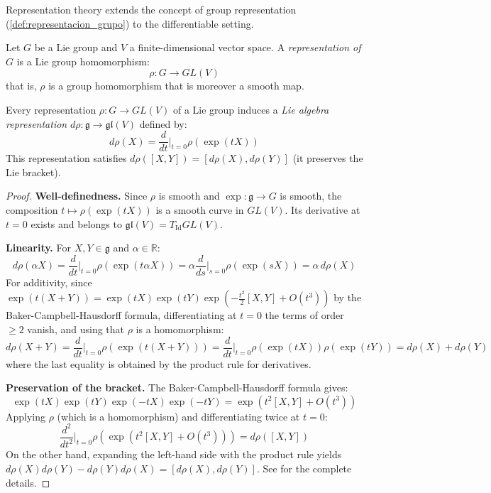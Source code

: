 Representation theory extends the concept of group representation (\autoref{def:representacion_grupo}) to the differentiable setting.

\begin{definition}\label{def:representacion_grupo_lie}
Let $G$ be a Lie group and $V$ a finite-dimensional vector space. A \textit{representation of $G$} is a Lie group homomorphism:
\begin{equation}
\rho: G \rightarrow GL(V)
\end{equation}
that is, $\rho$ is a group homomorphism that is moreover a smooth map.
\end{definition}

\begin{proposition}\label{prop:representacion_algebra_lie}
Every representation $\rho: G \rightarrow GL(V)$ of a Lie group induces a \textit{Lie algebra representation} $d\rho: \mathfrak{g} \rightarrow \mathfrak{gl}(V)$ defined by:
\begin{equation}
d\rho(X) = \frac{d}{dt}\Big|_{t=0} \rho(\exp(tX))
\end{equation}
This representation satisfies $d\rho([X,Y]) = [d\rho(X), d\rho(Y)]$ (it preserves the Lie bracket).
\end{proposition}

\begin{proof}
\textbf{Well-definedness.} Since $\rho$ is smooth and $\exp: \mathfrak{g} \to G$ is smooth, the composition $t \mapsto \rho(\exp(tX))$ is a smooth curve in $GL(V)$. Its derivative at $t=0$ exists and belongs to $\mathfrak{gl}(V) = T_{\text{Id}} GL(V)$.

\textbf{Linearity.} For $X, Y \in \mathfrak{g}$ and $\alpha \in \mathbb{R}$:
\[
d\rho(\alpha X) = \frac{d}{dt}\Big|_{t=0} \rho(\exp(t\alpha X)) = \alpha \frac{d}{ds}\Big|_{s=0} \rho(\exp(sX)) = \alpha\, d\rho(X)
\]
For additivity, since $\exp(t(X+Y)) = \exp(tX)\exp(tY)\exp(-\tfrac{t^2}{2}[X,Y] + O(t^3))$ by the Baker-Campbell-Hausdorff formula, differentiating at $t=0$ the terms of order $\geq 2$ vanish, and using that $\rho$ is a homomorphism:
\[
d\rho(X+Y) = \frac{d}{dt}\Big|_{t=0} \rho(\exp(t(X+Y))) = \frac{d}{dt}\Big|_{t=0} \rho(\exp(tX))\rho(\exp(tY)) = d\rho(X) + d\rho(Y)
\]
where the last equality is obtained by the product rule for derivatives.

\textbf{Preservation of the bracket.} The Baker-Campbell-Hausdorff formula gives:
\[
\exp(tX)\exp(tY)\exp(-tX)\exp(-tY) = \exp(t^2[X,Y] + O(t^3))
\]
Applying $\rho$ (which is a homomorphism) and differentiating twice at $t=0$:
\[
\frac{d^2}{dt^2}\Big|_{t=0} \rho(\exp(t^2[X,Y] + O(t^3))) = d\rho([X,Y])
\]
On the other hand, expanding the left-hand side with the product rule yields $d\rho(X)d\rho(Y) - d\rho(Y)d\rho(X) = [d\rho(X), d\rho(Y)]$. See \citep[Theorem~3.28]{Kirillov2008} for the complete details.
\end{proof}

